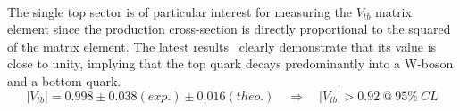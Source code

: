 \\
The single top sector is of particular interest for measuring the $V_{tb}$ matrix element since the production cross-section is directly proportional to the squared of the matrix element. The latest results~\cite{CMSVtbResult} clearly demonstrate that its value is close to unity, implying that the top quark decays predominantly into a W-boson and a bottom quark. 
\begin{equation}
 \vert V_{tb} \vert = 0.998 \pm 0.038 (exp.) \pm 0.016 (theo.) \quad \Rightarrow \quad \vert V_{tb} \vert > 0.92 ~ @ ~ 95 \% ~ CL
\end{equation}


